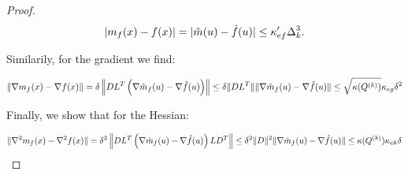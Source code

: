 \begin{proof}
\begin{align*}
 | m_f(x) - f(x)| = |\hat m(u) - \hat f(u)| \le \kappa_{ef}'\Delta_k^3.
\end{align*}

Similarily, for the gradient we find:

\begin{align*}
\| \nabla m_f(x) - \nabla f(x)\| = \delta\left\|DL^T\left(\nabla\hat m_f(u) - \nabla \hat f(u)\right)\right\| \le \delta \|DL^T\|\|\nabla \hat m_f(u) - \nabla \hat f(u)\| \le \sqrt{\kappa({Q^{(k)}})}\kappa_{eg} \delta^2 \\
\end{align*}

Finally, we show that for the Hessian:

\begin{align*}
\| \nabla^2 m_f(x) - \nabla^2 f(x)\| = \delta^2\left\|DL^T\left(\nabla\hat m_f(u) - \nabla \hat f(u)\right)LD^T\right\| \le \delta^2 \|D\|^2\|\nabla \hat m_f(u) - \nabla \hat f(u)\| \le \kappa({Q^{(k)}})\kappa_{eh} \delta \\
\end{align*}


\end{proof}

